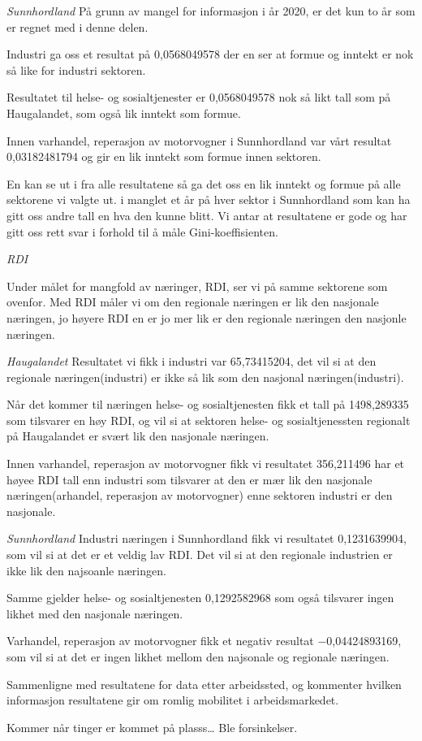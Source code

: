 \documentclass[
]{article}
\begin{document}
\emph{Sunnhordland} På grunn av mangel for informasjon i år 2020, er det
kun to år som er regnet med i denne delen.

Industri ga oss et resultat på 0,0568049578 der en ser at formue og
inntekt er nok så like for industri sektoren.

Resultatet til helse- og sosialtjenester er 0,0568049578 nok så likt
tall som på Haugalandet, som også lik inntekt som formue.

Innen varhandel, reperasjon av motorvogner i Sunnhordland var vårt
resultat 0,03182481794 og gir en lik inntekt som formue innen sektoren.

En kan se ut i fra alle resultatene så ga det oss en lik inntekt og
formue på alle sektorene vi valgte ut. i manglet et år på hver sektor i
Sunnhordland som kan ha gitt oss andre tall en hva den kunne blitt. Vi
antar at resultatene er gode og har gitt oss rett svar i forhold til å
måle Gini-koeffisienten.

\emph{RDI}

Under målet for mangfold av næringer, RDI, ser vi på samme sektorene som
ovenfor. Med RDI måler vi om den regionale næringen er lik den nasjonale
næringen, jo høyere RDI en er jo mer lik er den regionale næringen den
nasjonle næringen.

\emph{Haugalandet} Resultatet vi fikk i industri var 65,73415204, det
vil si at den regionale næringen(industri) er ikke så lik som den
nasjonal næringen(industri).

Når det kommer til næringen helse- og sosialtjenesten fikk et tall på
1498,289335 som tilsvarer en høy RDI, og vil si at sektoren helse- og
sosialtjenessten regionalt på Haugalandet er svært lik den nasjonale
næringen.

Innen varhandel, reperasjon av motorvogner fikk vi resultatet 356,211496
har et høyee RDI tall enn industri som tilsvarer at den er mær lik den
nasjonale næringen(arhandel, reperasjon av motorvogner) enne sektoren
industri er den nasjonale.

\emph{Sunnhordland} Industri næringen i Sunnhordland fikk vi resultatet
0,1231639904, som vil si at det er et veldig lav RDI. Det vil si at den
regionale industrien er ikke lik den najsoanle næringen.

Samme gjelder helse- og sosialtjenesten 0,1292582968 som også tilsvarer
ingen likhet med den nasjonale næringen.

Varhandel, reperasjon av motorvogner fikk et negativ resultat
−0,04424893169, som vil si at det er ingen likhet mellom den najsonale
og regionale næringen.

Sammenligne med resultatene for data etter arbeidssted, og kommenter
hvilken informasjon resultatene gir om romlig mobilitet i
arbeidsmarkedet.

Kommer når tinger er kommet på plasss\ldots{} Ble forsinkelser.
\end{document}
